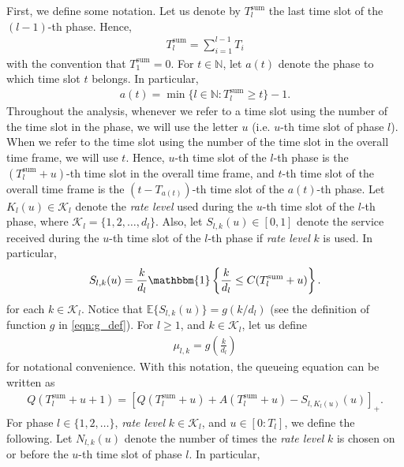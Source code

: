 \documentclass[12pt,draftcls, onecolumn]{IEEEtran}
\begin{document}
First, we define some notation. Let us denote by $T^{\text{sum}}_l$ the last time slot of the $(l-1)$-th phase. Hence,
\begin{align}\label{eqn:t_l_sum}
    T^{\text{sum}}_l = \sum_{i = 1}^{l-1}T_i
\end{align}
with the convention that $T^{\text{sum}}_1 = 0$. For $t \in \mathbb{N}$, let $a(t)$ denote the phase to which time slot $t$ belongs. In particular,
\begin{align}\label{eqn:a_t_def}
    a(t) = \min\{ l \in \mathbb{N}: T^{\text{sum}}_l \geq t\} - 1.
\end{align}
Throughout the analysis,  whenever we refer to a time slot using the number of the time slot in the phase, we will use the letter $u$ (i.e. $u$-th time slot of phase $l$). When we refer to the time slot using the number of the time slot in the overall time frame, we will use $t$. Hence, $u$-th time slot of the $l$-th phase is the $(T^{\text{sum}}_l + u)$-th time slot in the overall time frame, and $t$-th time slot of the overall time frame is the $(t-T_{a(t)})$-th time slot of the $a(t)$-th phase.
Let $K_l(u) \in \mathcal{K}_l$ denote the \emph{rate level} used during the $u$-th time slot of the $l$-th phase, where $\mathcal{K}_l = \{1,2,\dots,d_l\}$. Also, let $S_{l,k}(u) \in [0,1]$ denote the service received during the $u$-th time slot of the $l$-th phase if \emph{rate level} $k$ is used. In particular, 
\begin{align}\label{eqn:slt_klt_eqn}
S_{l,k}(u) = \frac{k}{d_l}\mathbbm{1}\left\{\frac{k}{d_l} \leq C(T^{\text{sum}}_l+u)\right\}.
\end{align}
for each $k \in \mathcal{K}_l$. Notice that $\mathbb{E}\{S_{l,k}(u)\} = g(k/d_l)$ (see the definition of function $g$ in \eqref{eqn:g_def}). For $l \geq 1$, and $k \in \mathcal{K}_l$, let us define
\begin{align}\label{eqn:mu_lk}
    \mu_{l,k} =  g\left(\frac{k}{d_l}\right)
\end{align}
for notational convenience. With this notation, the queueing equation can be written as
\begin{align}\label{eqn:queing_equation}
    Q(T^{\text{sum}}_l+u+1) = \left[Q(T^{\text{sum}}_l+u) + A(T^{\text{sum}}_l+u) - S_{l,K_l(u)}(u)\right]_+.
\end{align}
For phase $l \in \{1,2,\dots\}$, \emph{rate level} $k \in \mathcal{K}_l$, and $u \in [0:T_l]$, we define the following. Let $N_{l,k}(u)$ denote the number of times the \emph{rate level} $k$ is chosen on or before the $u$-th time slot of phase $l$. In particular,
\end{document}
